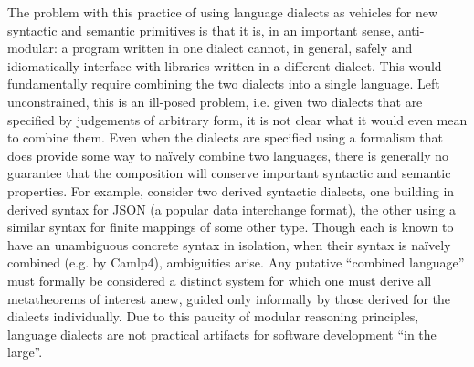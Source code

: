 The problem with this practice of using language dialects as vehicles for new syntactic and semantic primitives is that it is, in an important sense,  anti-modular: a program written in one dialect cannot, in general, safely and idiomatically interface with libraries written in a different dialect. %
This would fundamentally require combining the two dialects into a single language. Left unconstrained, this is an ill-posed problem, i.e. given two dialects that are specified by judgements of arbitrary form, it is not clear what it would even mean to combine them. Even when the dialects are specified using a formalism that does provide some way to na\"ively combine two languages, there is generally no guarantee that the composition will conserve important syntactic and semantic properties. %
For example, consider two derived syntactic dialects, one building in derived syntax for JSON (a popular data interchange format), the other using a similar syntax for finite mappings of some other type. Though each is known to have an unambiguous concrete syntax in isolation, when their syntax is na\"ively  combined (e.g. by Camlp4), ambiguities arise.  Any putative ``combined language'' must formally be considered a  distinct system for which one must derive all metatheorems of interest anew, guided only informally by those derived for the dialects individually. %
Due to this paucity of modular reasoning principles, language dialects are not practical artifacts for software development ``in the large''. %

